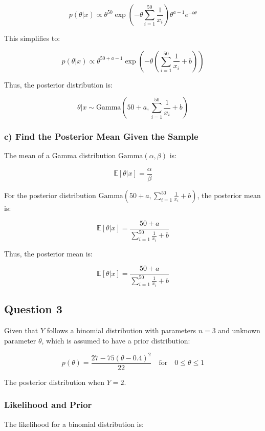 \documentclass{article}
\begin{document}
\[
p(\theta | x) \propto \theta^{50} \exp \left( -\theta \sum_{i=1}^{50} \frac{1}{x_i} \right) \theta^{a-1} e^{-b \theta}
\]

This simplifies to:

\[
p(\theta | x) \propto \theta^{50 + a - 1} \exp \left( -\theta \left( \sum_{i=1}^{50} \frac{1}{x_i} + b \right) \right)
\]

Thus, the posterior distribution is:

\[
\theta | x \sim \text{Gamma}(50 + a, \sum_{i=1}^{50} \frac{1}{x_i} + b)
\]

\subsubsection*{c) Find the Posterior Mean Given the Sample}

The mean of a Gamma distribution \( \text{Gamma}(\alpha, \beta) \) is:

\[
\mathbb{E}[\theta | x] = \frac{\alpha}{\beta}
\]

For the posterior distribution \( \text{Gamma}(50 + a, \sum_{i=1}^{50} \frac{1}{x_i} + b) \), the posterior mean is:

\[
\mathbb{E}[\theta | x] = \frac{50 + a}{\sum_{i=1}^{50} \frac{1}{x_i} + b}
\]

Thus, the posterior mean is:

\[
\boxed{\mathbb{E}[\theta | x] = \frac{50 + a}{\sum_{i=1}^{50} \frac{1}{x_i} + b}}
\]


\subsection*{Question 3}

Given that \( Y \) follows a binomial distribution with parameters \( n = 3 \) and unknown parameter \( \theta \), which is assumed to have a prior distribution:

\[
p(\theta) = \frac{27 - 75(\theta - 0.4)^2}{22} \quad \text{for} \quad 0 \leq \theta \leq 1
\]

The posterior distribution when \( Y = 2 \).

\subsubsection*{Likelihood and Prior}

The likelihood for a binomial distribution is:
\end{document}
